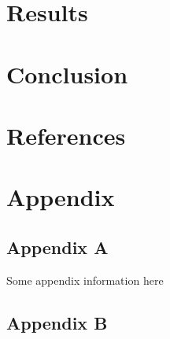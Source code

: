 \documentclass[11pt,preprint, authoryear]{elsarticle}
\numberwithin{equation}{section}
\numberwithin{figure}{section}
\numberwithin{table}{section}
\newlength{\cslhangindent}
\newenvironment{CSLReferences}%
  {\setlength{\parindent}{0pt}%
  \everypar{\setlength{\hangindent}{\cslhangindent}}\ignorespaces}%
  {\par}
\begin{document}
\hypertarget{results}{%
\section{Results}\label{results}}

\hfill

\hypertarget{conclusion}{%
\section{Conclusion}\label{conclusion}}

\newpage

\hypertarget{references}{%
\section*{References}\label{references}}

\hypertarget{refs}{}
\begin{CSLReferences}{0}{0}
\end{CSLReferences}

\hypertarget{appendix}{%
\section*{Appendix}\label{appendix}}

\hypertarget{appendix-a}{%
\subsection*{Appendix A}\label{appendix-a}}

Some appendix information here

\hypertarget{appendix-b}{%
\subsection*{Appendix B}\label{appendix-b}}


\end{document}
